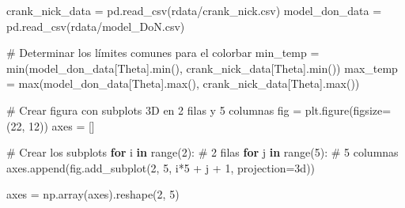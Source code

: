 \documentclass[
  spanish,
  us-letterpaper,
  DIV=11,
  numbers=noendperiod]{scrreprt}
\newenvironment{Shaded}{\begin{snugshade}}{\end{snugshade}}
\newcommand{\BuiltInTok}[1]{\textcolor[rgb]{0.00,0.23,0.31}{#1}}
\newcommand{\CommentTok}[1]{\textcolor[rgb]{0.37,0.37,0.37}{#1}}
\newcommand{\ControlFlowTok}[1]{\textcolor[rgb]{0.00,0.23,0.31}{\textbf{#1}}}
\newcommand{\DecValTok}[1]{\textcolor[rgb]{0.68,0.00,0.00}{#1}}
\newcommand{\KeywordTok}[1]{\textcolor[rgb]{0.00,0.23,0.31}{\textbf{#1}}}
\newcommand{\NormalTok}[1]{\textcolor[rgb]{0.00,0.23,0.31}{#1}}
\newcommand{\OperatorTok}[1]{\textcolor[rgb]{0.37,0.37,0.37}{#1}}
\newcommand{\StringTok}[1]{\textcolor[rgb]{0.13,0.47,0.30}{#1}}
\newcommand{\VerbatimStringTok}[1]{\textcolor[rgb]{0.13,0.47,0.30}{#1}}
\theoremstyle{plain}
\theoremstyle{definition}
\theoremstyle{remark}
\begin{document}
\begin{Shaded}
\begin{Highlighting}[]
\NormalTok{crank\_nick\_data }\OperatorTok{=}\NormalTok{ pd.read\_csv(}\VerbatimStringTok{r\textquotesingle{}data/crank\_nick}\DecValTok{.}\VerbatimStringTok{csv\textquotesingle{}}\NormalTok{)}
\NormalTok{model\_don\_data }\OperatorTok{=}\NormalTok{ pd.read\_csv(}\VerbatimStringTok{r\textquotesingle{}data/model\_DoN}\DecValTok{.}\VerbatimStringTok{csv\textquotesingle{}}\NormalTok{)}

\CommentTok{\# Determinar los límites comunes para el colorbar}
\NormalTok{min\_temp }\OperatorTok{=} \BuiltInTok{min}\NormalTok{(model\_don\_data[}\StringTok{\textquotesingle{}Theta\textquotesingle{}}\NormalTok{].}\BuiltInTok{min}\NormalTok{(),}
\NormalTok{                crank\_nick\_data[}\StringTok{\textquotesingle{}Theta\textquotesingle{}}\NormalTok{].}\BuiltInTok{min}\NormalTok{())}
\NormalTok{max\_temp }\OperatorTok{=} \BuiltInTok{max}\NormalTok{(model\_don\_data[}\StringTok{\textquotesingle{}Theta\textquotesingle{}}\NormalTok{].}\BuiltInTok{max}\NormalTok{(), }
\NormalTok{                crank\_nick\_data[}\StringTok{\textquotesingle{}Theta\textquotesingle{}}\NormalTok{].}\BuiltInTok{max}\NormalTok{())}

\CommentTok{\# Crear figura con subplots 3D en 2 filas y 5 columnas}
\NormalTok{fig }\OperatorTok{=}\NormalTok{ plt.figure(figsize}\OperatorTok{=}\NormalTok{(}\DecValTok{22}\NormalTok{, }\DecValTok{12}\NormalTok{))}
\NormalTok{axes }\OperatorTok{=}\NormalTok{ []}

\CommentTok{\# Crear los subplots}
\ControlFlowTok{for}\NormalTok{ i }\KeywordTok{in} \BuiltInTok{range}\NormalTok{(}\DecValTok{2}\NormalTok{):  }\CommentTok{\# 2 filas}
    \ControlFlowTok{for}\NormalTok{ j }\KeywordTok{in} \BuiltInTok{range}\NormalTok{(}\DecValTok{5}\NormalTok{):  }\CommentTok{\# 5 columnas}
\NormalTok{        axes.append(fig.add\_subplot(}\DecValTok{2}\NormalTok{, }\DecValTok{5}\NormalTok{, i}\OperatorTok{*}\DecValTok{5} \OperatorTok{+}\NormalTok{ j }\OperatorTok{+} \DecValTok{1}\NormalTok{, projection}\OperatorTok{=}\StringTok{\textquotesingle{}3d\textquotesingle{}}\NormalTok{))}

\NormalTok{axes }\OperatorTok{=}\NormalTok{ np.array(axes).reshape(}\DecValTok{2}\NormalTok{, }\DecValTok{5}\NormalTok{)}


\end{Highlighting}
\end{Shaded}
\end{document}
